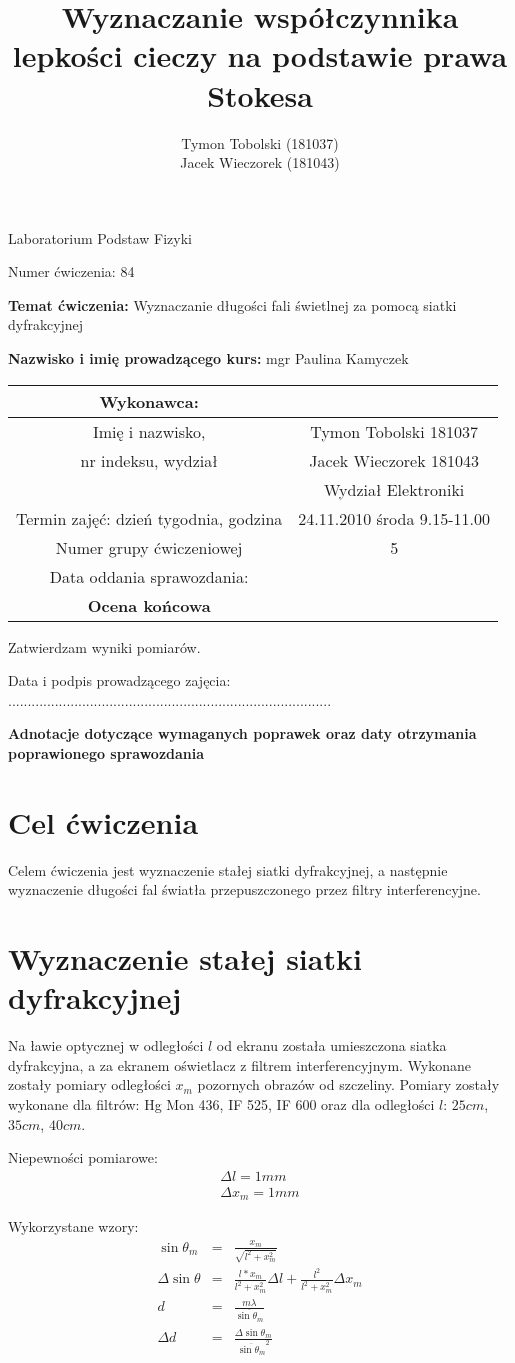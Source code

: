 \documentclass[wide,a4paper,titlepage,12pt]{mwart}
\title{Wyznaczanie współczynnika lepkości cieczy na podstawie prawa Stokesa}
\author{Tymon Tobolski (181037)\\Jacek Wieczorek (181043)}
\makeatletter
\renewcommand{\maketitle}{ 
\begin{titlepage}
	\begin{center}
		\vspace*{3cm} \LARGE Laboratorium Podstaw Fizyki \par \vspace{1cm} \normalsize Numer ćwiczenia: 84 \par 
	\end{center}
	
	{\bf Temat ćwiczenia:} Wyznaczanie długości fali świetlnej za pomocą siatki dyfrakcyjnej \par {\bf Nazwisko i imię prowadzącego kurs:} mgr Paulina Kamyczek \par
	
	\vspace{2cm}
	
	\begin{table}
		[h] 
		\begin{center}
			\begin{tabular}
				{|c|c|} \hline Wykonawca: & \\
				\hline Imię i nazwisko, & Tymon Tobolski 181037 \\
				nr indeksu, wydział & Jacek Wieczorek 181043 \\
				& Wydział Elektroniki \\
				\hline Termin zajęć: dzień tygodnia, godzina & 24.11.2010 środa 9.15-11.00 \\
				\hline Numer grupy ćwiczeniowej & 5 \\
				\hline Data oddania sprawozdania: & \\
				\hline {\bf Ocena końcowa} & \\
				\hline 
			\end{tabular}
		\end{center}
	\end{table}
	\vspace{2cm} Zatwierdzam wyniki pomiarów. \par Data i podpis prowadzącego zajęcia: ................................................................................... \par
	
	\vspace{2cm} {\bf Adnotacje dotyczące wymaganych poprawek oraz daty otrzymania poprawionego sprawozdania}
\end{titlepage}
}
\makeatother
\begin{document}
 
\maketitle

\section{Cel ćwiczenia} 

\label{sec:Cel} Celem ćwiczenia jest wyznaczenie stałej siatki dyfrakcyjnej, a następnie wyznaczenie długości fal światła przepuszczonego przez filtry interferencyjne. 


\section{Wyznaczenie stałej siatki dyfrakcyjnej}

Na ławie optycznej w odległości $l$ od ekranu została umieszczona siatka dyfrakcyjna, a za ekranem oświetlacz z filtrem interferencyjnym.
Wykonane zostały pomiary odległości $x_m$ pozornych obrazów od szczeliny. Pomiary zostały wykonane dla filtrów: Hg Mon 436, IF 525, IF 600 oraz dla odległości $l$: $25cm$, $35cm$, $40cm$. 
\newline

Niepewności pomiarowe:
\begin{eqnarray*}
	\Delta l = 1 mm \\
	\Delta x_m = 1 mm
\end{eqnarray*}

Wykorzystane wzory:
\begin{eqnarray*}
	\sin{\theta}_m &=& \frac{x_m}{\sqrt{l^2 + x_m^2}} \\
	\Delta \sin{\theta} &=& \frac{l*x_m}{l^2 + x_m^2}\Delta l + \frac{l^2}{l^2 + x_m^2} \Delta x_m \\
	d &=& \frac{m\lambda}{\overline{\sin{\theta}_m}} \\
	\Delta d &=& \frac{\Delta \sin{\theta_m}}{\overline{\sin{\theta}_m}^2}
\end{eqnarray*}
\end{document}
